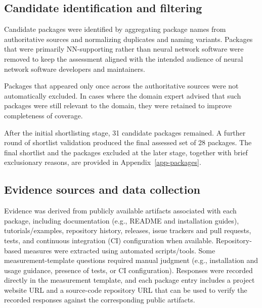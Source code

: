\documentclass[final,1p,times,authoryear,12pt]{elsarticle}
\providecommand{\wss}[1]{\textcolor{blue}{\textit{#1}}}
\begin{document}
\subsection{Candidate identification and filtering}\label{filtering}


Candidate packages were identified by aggregating package
names from authoritative sources and normalizing duplicates
and naming variants. Packages that were primarily
NN-supporting rather than neural network software were
removed to keep the assessment aligned with the intended
audience of neural network software developers and
maintainers.

Packages that appeared only once across the authoritative
sources were not automatically excluded. In cases where the
domain expert advised that such packages were still relevant
to the domain, they were retained to improve completeness of
coverage.

After the initial shortlisting stage, 31 candidate packages
remained. A further round of shortlist validation produced
the final assessed set of 28 packages. The final shortlist
and the packages excluded at the later stage, together with
brief exclusionary reasons, are provided in
Appendix~\ref{app-packages}.

\subsection{Evidence sources and data collection}\label{data}

Evidence was derived from publicly available artifacts associated with each package,
including documentation (e.g., README and installation guides), tutorials/examples,
repository history, releases, issue trackers and pull requests, tests, and continuous integration (CI) configuration when available.
Repository-based measures were extracted using automated scripts/tools. Some measurement-template questions required manual
 judgment (e.g., installation and usage guidance, presence of tests, or CI configuration).
 Responses were recorded directly in the measurement template, and each package entry includes a project website URL and a source-code
 repository URL that can be used to verify the recorded responses against the corresponding public artifacts.
\end{document}
